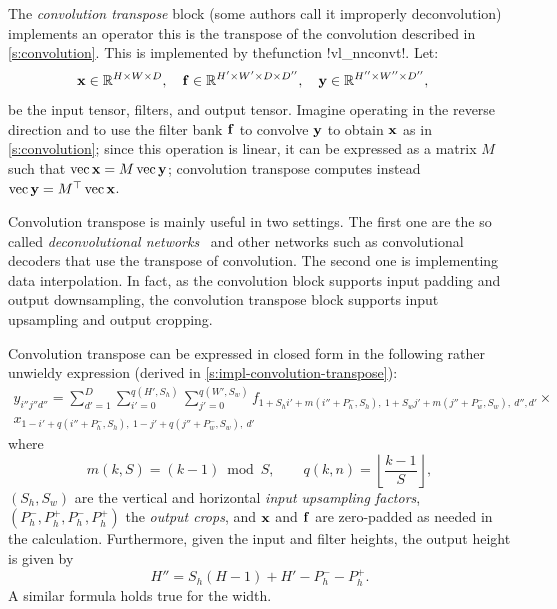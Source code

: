 The \emph{convolution transpose} block (some authors call it improperly deconvolution) implements an operator this is the transpose of the convolution described in \autoref{s:convolution}. This is  implemented by thefunction !vl_nnconvt!. Let:
\[
 \mathbf{x}\in\mathbb{R}^{H \times W \times D}, \quad
 \mathbf{f}\in\mathbb{R}^{H' \times W' \times D \times D''}, \quad
 \mathbf{y}\in\mathbb{R}^{H'' \times W'' \times D''}, \quad
\]
be the input tensor, filters, and output tensor. Imagine operating in the reverse direction and to use the filter bank $\mathbf{f}$ to convolve $\mathbf{y}$ to obtain $\mathbf{x}$ as in \autoref{s:convolution}; since this operation is linear, it can be expressed as a matrix $M$ such that  $\operatorname{vec} \mathbf{x} = M \operatorname{vec}\mathbf{y}$; convolution transpose computes instead $\operatorname{vec} \mathbf{y} = M^\top \operatorname{vec} \mathbf{x}$.

Convolution transpose is mainly useful in two settings. The first one are the so called \emph{deconvolutional networks}~\cite{zeiler14visualizing} and other networks such as convolutional decoders that use the transpose of convolution. The second one is implementing data interpolation. In fact, as the convolution block supports input padding and output downsampling, the convolution transpose block supports input upsampling and output cropping. 

Convolution transpose can be expressed in closed form in the following rather unwieldy expression (derived in \autoref{s:impl-convolution-transpose}):
\begin{multline}\label{e:convt}
y_{i''j''d''} = 
 \sum_{d'=1}^{D}
 \sum_{i'=0}^{q(H',S_h)}
 \sum_{j'=0}^{q(W',S_w)}
f_{
1+ S_hi' + m(i''+ P_h^-, S_h),\ %
1+ S_wj' + m(j''+ P_w^-, S_w),\ %
d'',
d'
} 
\times \\
x_{
1 - i' + q(i''+P_h^-,S_h),\ %
1 - j' + q(j''+P_w^-,S_w),\ %
d'
}
\end{multline}
where
\[
m(k,S) = (k - 1) \bmod S,
\qquad
q(k,n) = \left\lfloor \frac{k-1}{S} \right\rfloor,
\]
$(S_h,S_w)$ are the vertical and horizontal \emph{input upsampling factors},  $(P_h^-,P_h^+,P_h^-,P_h^+)$ the \emph{output crops}, and $\mathbf{x}$ and $\mathbf{f}$ are zero-padded as needed in the calculation. Furthermore, given the input and filter heights, the output height is given by
\[
  H'' = S_h (H - 1) + H' -P^-_h - P^+_h.
\]
A similar formula holds true for the width.

